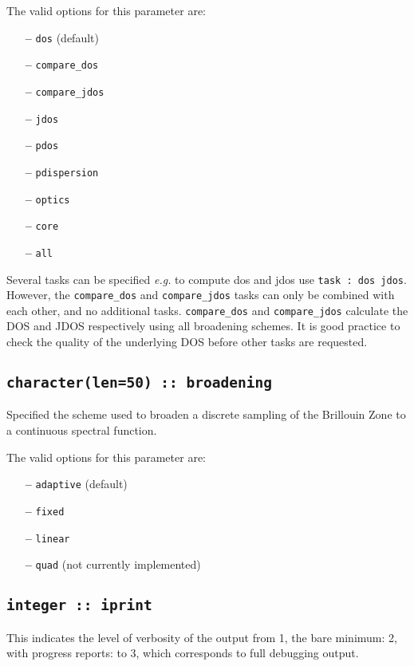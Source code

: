 \documentclass[a4paper,11pt,twoside]{book}
\begin{document}
{The valid options for this parameter are:
\begin{itemize}
\item[{\bf --}]  \verb#dos# (default)
\item[{\bf --}]  \verb#compare_dos#
\item[{\bf --}]  \verb#compare_jdos#
\item[{\bf --}]  \verb#jdos#
\item[{\bf --}]  \verb#pdos#
\item[{\bf --}]  \verb#pdispersion#
\item[{\bf --}]  \verb#optics#
\item[{\bf --}]  \verb#core#
\item[{\bf --}]  \verb#all#
\end{itemize}
Several tasks can be specified \emph{e.g.} to compute dos and jdos use
\verb#task : dos jdos#.
However, the \verb#compare_dos# and \verb#compare_jdos# tasks can only be combined with each other, and no additional tasks.
\verb#compare_dos# and \verb#compare_jdos# calculate the DOS and JDOS respectively using all broadening schemes. It is good practice to check the quality of the underlying DOS before other tasks are requested.

\subsection[broadening]{\tt character(len=50) :: broadening}

Specified the scheme used to broaden a discrete sampling of the
Brillouin Zone to a continuous spectral function.

The valid options for this parameter are:
\begin{itemize}
\item[{\bf --}]  \verb#adaptive# (default)
\item[{\bf --}]  \verb#fixed#
\item[{\bf --}]  \verb#linear#
\item[{\bf --}]  \verb#quad# (not currently implemented)
\end{itemize}

\subsection[iprint]{\tt integer :: iprint}

This indicates the level of verbosity of the output from 1,
the bare minimum: 2, with progress reports: to 3, which corresponds to full debugging output.

}
\end{document}
